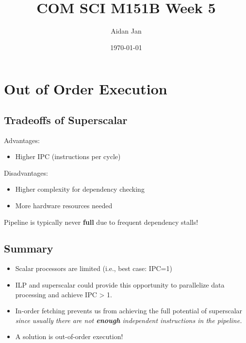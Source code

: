 \documentclass[10pt]{article}
\title{COM SCI M151B Week 5}
\author{Aidan Jan}
\date{\today}
\begin{document}
\maketitle

\section*{Out of Order Execution}
\subsection*{Tradeoffs of Superscalar}
Advantages:
\begin{itemize}
    \item Higher IPC (instructions per cycle)
\end{itemize}
Disadvantages:
\begin{itemize}
    \item Higher complexity for dependency checking
    \item More hardware resources needed
\end{itemize}
Pipeline is typically never \textbf{full} due to frequent dependency stalls!
\subsection*{Summary}
\begin{itemize}
    \item Scalar processors are limited (i.e., best case: IPC=1)
    \item ILP and superscalar could provide this opportunity to parallelize data processing and achieve IPC > 1.
    \item In-order fetching prevents us from achieving the full potential of superscalar \textit{since usually there are not \textbf{enough} independent instructions in the pipeline.} 
    \item A solution is out-of-order execution!
\end{itemize}
\end{document}
